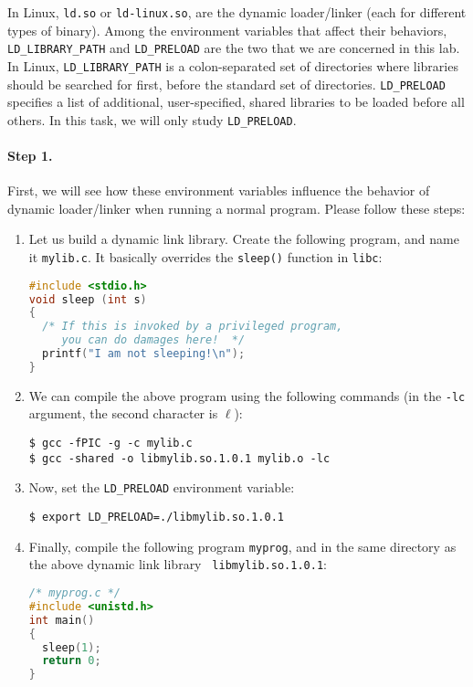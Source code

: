 In Linux, {\tt ld.so} or {\tt ld-linux.so}, are the dynamic
loader/linker (each for different types of binary).
Among the environment variables that affect their behaviors,
{\tt LD\_LIBRARY\_PATH} and {\tt LD\_PRELOAD} are the two
that we are concerned in this lab.
In Linux, {\tt LD\_LIBRARY\_PATH} is a colon-separated set
of directories where libraries should be searched for first, before the
standard set of directories.
{\tt LD\_PRELOAD} specifies a list of additional, user-specified, shared libraries to
be loaded before all others. In this task, we will only
study {\tt LD\_PRELOAD}.


\paragraph{Step 1.}
First, we will see how these environment variables influence the
behavior of dynamic loader/linker when running a normal program.
Please follow these steps:


\begin{enumerate}
  \item Let us build a dynamic link library. Create the following program,
  and name it {\tt mylib.c}. It basically overrides the {\tt sleep()} function
  in {\tt libc}:
\begin{lstlisting}[language=C]
#include <stdio.h>
void sleep (int s)
{
  /* If this is invoked by a privileged program,
     you can do damages here!  */
  printf("I am not sleeping!\n");
}
\end{lstlisting}

  \item We can compile the above program using the following commands (in the
  {\tt -lc} argument, the second character is $\ell$):
\begin{lstlisting}
$ gcc -fPIC -g -c mylib.c
$ gcc -shared -o libmylib.so.1.0.1 mylib.o -lc
\end{lstlisting}



  \item Now, set the {\tt LD\_PRELOAD} environment variable:
\begin{lstlisting}
$ export LD_PRELOAD=./libmylib.so.1.0.1
\end{lstlisting}

  \item Finally, compile the following program {\tt myprog}, and
  in the same directory as the above dynamic link library {\tt
  libmylib.so.1.0.1}:
\begin{lstlisting}[language=C]
/* myprog.c */
#include <unistd.h>
int main()
{
  sleep(1);
  return 0;
}
\end{lstlisting}
\end{enumerate}


